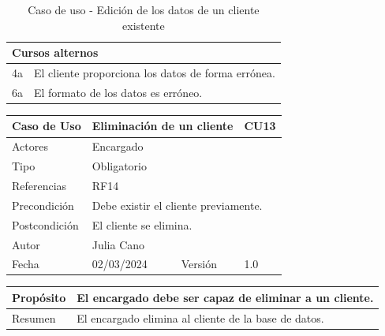 \begin{table}[H]
	\centering
	\begin{tabular}{| m{} | m{} | m{} | m{} |}
		\hline
		\multicolumn{4}{|m{0.9\textwidth}|}{Cursos alternos}     \\ 
		\hline
		4a & \multicolumn{3}{m{0.67\textwidth}|}{El cliente proporciona los datos de forma errónea.} \\ 
		\hline
		6a & \multicolumn{3}{m{0.67\textwidth}|}{El formato de los datos es erróneo.} \\ 
		\hline
	\end{tabular}
	\caption{Caso de uso - Edición de los datos de un cliente existente}
\end{table}

\newpage


\begin{table}[H]
	\centering
	\begin{tabular}{| m{} | m{} | m{} | m{}|}
		\hline
		\rowcolor{grayshade} Caso de Uso & \multicolumn{2}{|m{0.43\textwidth}|}{Eliminación de un cliente} &  CU13\\ 
		\hline
		Actores & \multicolumn{3}{l|}{Encargado} \\ 
		\hline
		Tipo & \multicolumn{3}{l|}{Obligatorio} \\ 
		\hline
		Referencias & \multicolumn{3}{l|}{RF14} \\ 
		\hline
		Precondición & \multicolumn{3}{m{0.67\textwidth}|}{Debe existir el cliente previamente.} \\ 
		\hline
		Postcondición & \multicolumn{3}{m{0.67\textwidth}|}{El cliente se elimina.} \\ 
		\hline
		Autor & \multicolumn{3}{l|}{Julia Cano} \\ 
		\hline
		Fecha & 02/03/2024 & Versión & 1.0 \\
		\hline
	\end{tabular}
\end{table}

\begin{table}[H]
	\centering
	\begin{tabular}{| m{} | m{} | m{} | m{} |}
		\hline
		Propósito & \multicolumn{3}{m{0.67\textwidth}|}{El encargado debe ser capaz de eliminar a un cliente.}  \\ 
		\hline
		Resumen & \multicolumn{3}{m{0.67\textwidth}|}{El encargado elimina al cliente de la base de datos.} \\ 
		\hline
	\end{tabular}
\end{table}


